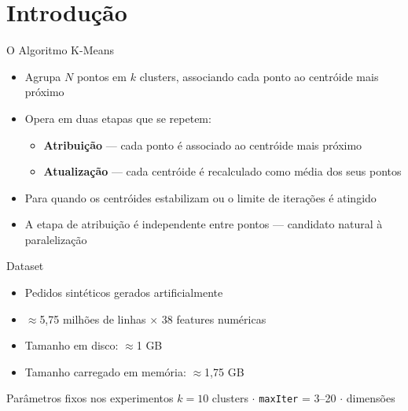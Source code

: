 \section{Introdução}

\begin{frame}{O Algoritmo K-Means}
    \begin{itemize}
        \item Agrupa \(N\) pontos em \(k\) clusters, associando cada ponto ao centróide mais próximo
        \item Opera em duas etapas que se repetem:
            \begin{itemize}
                \item \textbf{Atribuição} — cada ponto é associado ao centróide mais próximo
                \item \textbf{Atualização} — cada centróide é recalculado como média dos seus pontos
            \end{itemize}
        \item Para quando os centróides estabilizam ou o limite de iterações é atingido
        \item A etapa de atribuição é \alert{independente entre pontos} --- candidato natural à paralelização
    \end{itemize}
\end{frame}

\begin{frame}{Dataset}
    \begin{itemize}
        \item Pedidos sintéticos gerados artificialmente
        \item \alert{$\approx$5,75 milhões} de linhas $\times$ 38 features numéricas
        \item Tamanho em disco: $\approx$1 GB
        \item Tamanho carregado em memória: $\approx$1,75 GB
    \end{itemize}

    \vspace{0.5em}
    \begin{block}{Parâmetros fixos nos experimentos}
        $k = 10$ clusters \quad $\cdot$ \quad \texttt{maxIter} = 3--20 \quad $\cdot$  dimensões
    \end{block}
\end{frame}

